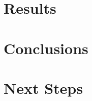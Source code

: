 \documentclass[11pt,a4paper]{article}
\begin{document}
\section{Results}

%
%
%

\section{Conclusions}


\section{Next Steps}

\end{document}
